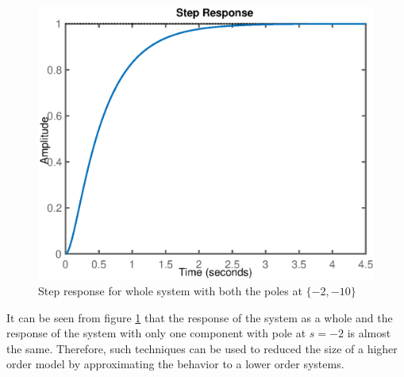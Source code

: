 \begin{figure}[h!]
	\centering
	\includegraphics[width=0.7\linewidth]{Bilder/MOR_E1_S_step.eps}
	\caption{Step response for whole system with both the poles at $\{ -2,-10 \}$}
	\label{Fig_MOR_E1_S_step}
\end{figure}
It can be seen from figure \ref{Fig_MOR_E1_S_step} that the response of the system as a whole and the response of the system with only one component with pole at $s = -2$ is almost the same. Therefore, such techniques can be used to reduced the size of a higher order model by approximating the behavior to a lower order systems. 

